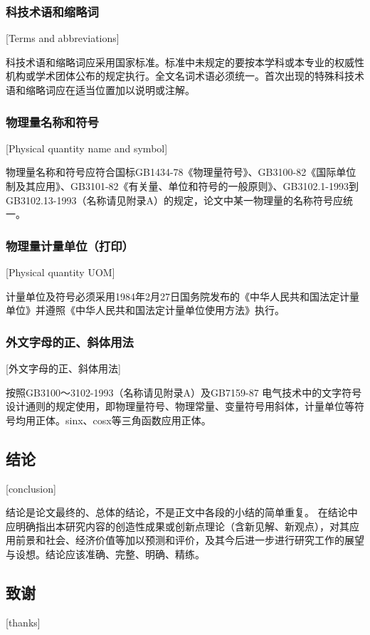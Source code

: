 \subsubsection{科技术语和缩略词}[Terms and abbreviations]

科技术语和缩略词应采用国家标准。标准中未规定的要按本学科或本专业的权威性机构或学术团体公布的规定执行。全文名词术语必须统一。首次出现的特殊科技术语和缩略词应在适当位置加以说明或注解。

\subsubsection{物理量名称和符号}[Physical quantity name and symbol]

物理量名称和符号应符合国标GB1434-78《物理量符号》、GB3100-82《国际单位制及其应用》、GB3101-82《有关量、单位和符号的一般原则》、GB3102.1-1993到GB3102.13-1993（名称请见附录A）的规定，论文中某一物理量的名称符号应统一。

\subsubsection{物理量计量单位（打印）}[Physical quantity UOM]

 计量单位及符号必须采用1984年2月27日国务院发布的《中华人民共和国法定计量单位》并遵照《中华人民共和国法定计量单位使用方法》执行。

\subsubsection{外文字母的正、斜体用法}[外文字母的正、斜体用法]

按照GB3100～3102-1993（名称请见附录A）及GB7159-87 电气技术中的文字符号设计通则的规定使用，即物理量符号、物理常量、变量符号用斜体，计量单位等符号均用正体。sinx、cosx等三角函数应用正体。

\subsection{结论}[conclusion]

结论是论文最终的、总体的结论，不是正文中各段的小结的简单重复。
在结论中应明确指出本研究内容的创造性成果或创新点理论（含新见解、新观点），对其应用前景和社会、经济价值等加以预测和评价，及其今后进一步进行研究工作的展望与设想。结论应该准确、完整、明确、精练。

\subsection{致谢}[thanks]


